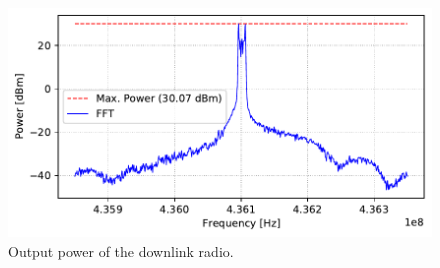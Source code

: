 \begin{figure}[!ht]
    \begin{center}
        \includegraphics[width=\textwidth]{curves/downlink_output_power.pdf}
        \caption{Output power of the downlink radio.}
        \label{fig:downlink-power}
    \end{center}
\end{figure}
